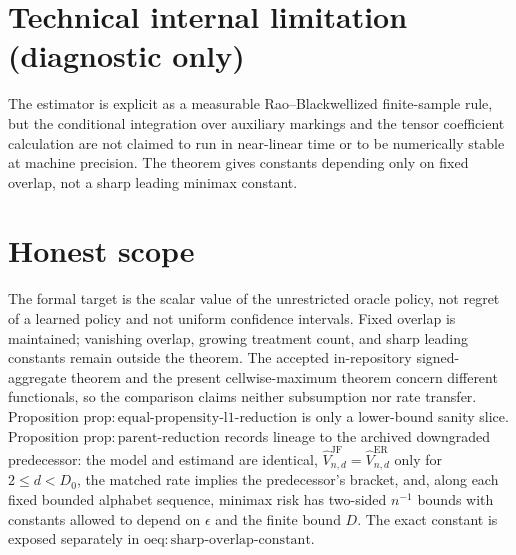 \documentclass{article}
\begin{document}
\section*{Technical internal limitation (diagnostic only)}

The estimator is explicit as a measurable Rao--Blackwellized finite-sample rule, but the conditional integration over auxiliary markings and the tensor coefficient calculation are not claimed to run in near-linear time or to be numerically stable at machine precision. The theorem gives constants depending only on fixed overlap, not a sharp leading minimax constant.

\section{Honest scope}

The formal target is the scalar value of the unrestricted oracle policy, not regret of a learned policy and not uniform confidence intervals. Fixed overlap is maintained; vanishing overlap, growing treatment count, and sharp leading constants remain outside the theorem. The accepted in-repository signed-aggregate theorem and the present cellwise-maximum theorem concern different functionals, so the comparison claims neither subsumption nor rate transfer. Proposition \(\mathrm{prop:equal\mbox{-}propensity\mbox{-}l1\mbox{-}reduction}\) is only a lower-bound sanity slice. Proposition \(\mathrm{prop:parent\mbox{-}reduction}\) records lineage to the archived downgraded predecessor: the model and estimand are identical, \(\widehat V_{n,d}^{\mathrm{JF}}=\widehat V_{n,d}^{\mathrm{ER}}\) only for \(2\leq d<D_0\), the matched rate implies the predecessor's bracket, and, along each fixed bounded alphabet sequence, minimax risk has two-sided \(n^{-1}\) bounds with constants allowed to depend on \(\epsilon\) and the finite bound \(D\). The exact constant is exposed separately in \(\mathrm{oeq:sharp\mbox{-}overlap\mbox{-}constant}\).
\end{document}
